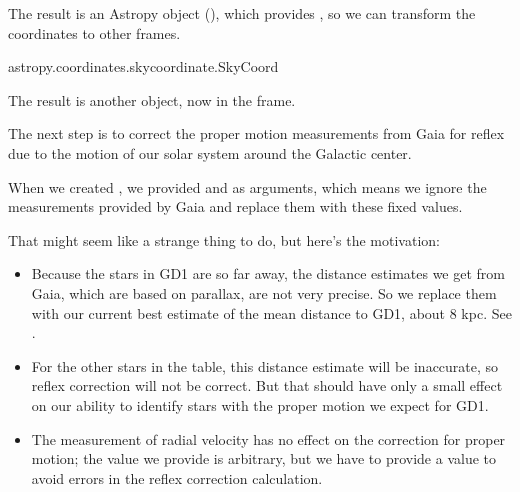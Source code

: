 \documentclass[letterpaper,10pt,english]{sphinxmanual}
\begin{document}
The result is an Astropy  object (), which provides , so we can transform the coordinates to other frames.

\begin{sphinxVerbatim}[commandchars=\\\{\}]
   

  
\end{sphinxVerbatim}

\begin{sphinxVerbatim}[commandchars=\\\{\}]
astropy.coordinates.sky\PYGZus{}coordinate.SkyCoord
\end{sphinxVerbatim}

The result is another  object, now in the  frame.

The next step is to correct the proper motion measurements from Gaia for reflex due to the motion of our solar system around the Galactic center.

When we created , we provided  and  as arguments, which means we ignore the measurements provided by Gaia and replace them with these fixed values.

That might seem like a strange thing to do, but here’s the motivation:
\begin{itemize}
\item {} 
Because the stars in GD\sphinxhyphen{}1 are so far away, the distance estimates we get from Gaia, which are based on parallax, are not very precise.  So we replace them with our current best estimate of the mean distance to GD\sphinxhyphen{}1, about 8 kpc.  See .

\item {} 
For the other stars in the table, this distance estimate will be inaccurate, so reflex correction will not be correct.  But that should have only a small effect on our ability to identify stars with the proper motion we expect for GD\sphinxhyphen{}1.

\item {} 
The measurement of radial velocity has no effect on the correction for proper motion; the value we provide is arbitrary, but we have to provide a value to avoid errors in the reflex correction calculation.

\end{itemize}
\end{document}
